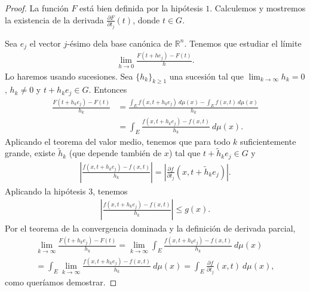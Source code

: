 \begin{proof}
    La función $F$ está bien definida por la hipótesis $1$. Calculemos y mostremos la existencia de la derivada $\frac{\partial F}{\partial t_j}(t)$, donde $t \in G$.

    Sea $e_j$ el vector $j$-ésimo dela base canónica de $\mathbb{R}^n$. Tenemos que estudiar el límite
    \begin{align*}
        \lim_{h \to 0}{\frac{F(t + he_j) - F(t)}{h}}.
    \end{align*}
    Lo haremos usando sucesiones. Sea $\{h_k\}_{k \ge 1}$ una sucesión tal que $\lim_{k \to \infty}{h_k} = 0$, $h_k \not = 0$ y $t + h_ke_j \in G$. Entonces
    \begin{align*}
        {\frac{F(t + h_ke_j) - F(t)}{h_k}} & = \frac{\int_{E}{f(x,t+h_ke_j) \ d\mu(x)} - {\int_{E}{f(x,t)}} \ d\mu(x)}{h_k} \\
                                           & = \int_{E}{\frac{f(x,t+h_ke_j) - f(x,t)}{h_k} \ d\mu(x)}.
    \end{align*}
    Aplicando el teorema del valor medio, tenemos que para todo $k$ suficientemente grande, existe $\widetilde{h}_k$ (que depende también de $x$) tal que $t + \widetilde{h}_ke_j \in G$ y
    \begin{align*}
        \left| \frac{f(x,t+h_ke_j) - f(x,t)}{h_k} \right| = \left| \frac{\partial f}{\partial t_j}(x,t+\widetilde{h}_ke_j) \right|.
    \end{align*}
    Aplicando la hipótesis $3$, tenemos
    \begin{align*}
        \left| \frac{f(x,t+h_ke_j) - f(x,t)}{h_k} \right| \leq g(x).
    \end{align*}
    Por el teorema de la convergencia dominada y la definición de derivada parcial,
    \begin{align*}
        \lim_{k \to \infty}{\frac{F(t+h_ke_j) - F(t)}{h_k}} = \lim_{k \to \infty}{\int_{E}{\frac{f(x,t+h_ke_j) - f(x,t)}{h_k} \ d\mu(x)}} \\
        = \int_{E}{\lim_{k \to \infty}{\frac{f(x,t+h_ke_j) - f(x,t)}{h_k}} \ d\mu(x)} = \int_{E}{\frac{\partial f}{\partial t_j}(x,t) \ d\mu(x)},
    \end{align*}
    como queríamos demostrar.
\end{proof}

